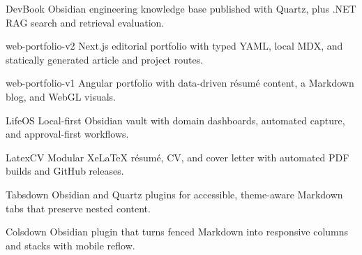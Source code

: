 

\begin{cvprojects}

  \cvproject
    {DevBook}
    {Obsidian engineering knowledge base published with Quartz, plus .NET RAG search and retrieval evaluation.}

  \cvproject
    {web-portfolio-v2}
    {Next.js editorial portfolio with typed YAML, local MDX, and statically generated article and project routes.}

  \cvproject
    {web-portfolio-v1}
    {Angular portfolio with data-driven résumé content, a Markdown blog, and WebGL visuals.}

  \cvproject
    {LifeOS}
    {Local-first Obsidian vault with domain dashboards, automated capture, and approval-first workflows.}

  \cvproject
    {LatexCV}
    {Modular XeLaTeX résumé, CV, and cover letter with automated PDF builds and GitHub releases.}

  \cvproject
    {Tabsdown}
    {Obsidian and Quartz plugins for accessible, theme-aware Markdown tabs that preserve nested content.}

  \cvproject
    {Colsdown}
    {Obsidian plugin that turns fenced Markdown into responsive columns and stacks with mobile reflow.}

\end{cvprojects}
